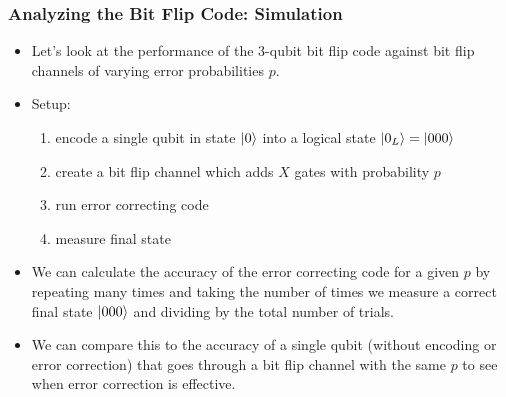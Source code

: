 \documentclass{beamer}
\begin{document}
\begin{frame}
    \frametitle{Analyzing the Bit Flip Code: Simulation}
    \begin{itemize}
        \item<1-> Let's look at the performance of the 3-qubit bit flip code against bit flip channels of varying error probabilities $p$.
        \item<2-> Setup: 
        \begin{enumerate}
            \item encode a single qubit in state $\left\vert{0}\right\rangle$ into a logical state $\left\vert{0_L}\right\rangle = \left\vert{000}\right\rangle$
            \item create a bit flip channel which adds $X$ gates with probability $p$
            \item run error correcting code
            \item measure final state 
        \end{enumerate}
        \item<3-> We can calculate the accuracy of the error correcting code for a given $p$ by repeating many times and taking the number of times we measure a correct final state $\left\vert{000}\right\rangle$ and dividing by the total number of trials.
        \item<4-> We can compare this to the accuracy of a single qubit (without encoding or error correction) that goes through a bit flip channel with the same $p$ to see when error correction is effective.
    \end{itemize}
\end{frame}
\end{document}
